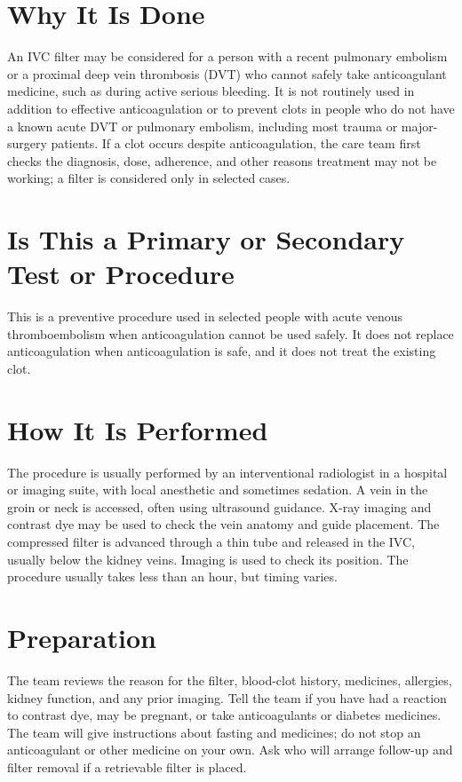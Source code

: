 \section*{Why It Is Done}
An IVC filter may be considered for a person with a recent pulmonary embolism or a proximal deep vein thrombosis (DVT) who cannot safely take anticoagulant medicine, such as during active serious bleeding. It is not routinely used in addition to effective anticoagulation or to prevent clots in people who do not have a known acute DVT or pulmonary embolism, including most trauma or major-surgery patients. If a clot occurs despite anticoagulation, the care team first checks the diagnosis, dose, adherence, and other reasons treatment may not be working; a filter is considered only in selected cases.

\section*{Is This a Primary or Secondary Test or Procedure}
This is a preventive procedure used in selected people with acute venous thromboembolism when anticoagulation cannot be used safely. It does not replace anticoagulation when anticoagulation is safe, and it does not treat the existing clot.

\section*{How It Is Performed}
The procedure is usually performed by an interventional radiologist in a hospital or imaging suite, with local anesthetic and sometimes sedation. A vein in the groin or neck is accessed, often using ultrasound guidance. X-ray imaging and contrast dye may be used to check the vein anatomy and guide placement. The compressed filter is advanced through a thin tube and released in the IVC, usually below the kidney veins. Imaging is used to check its position. The procedure usually takes less than an hour, but timing varies.

\section*{Preparation}
The team reviews the reason for the filter, blood-clot history, medicines, allergies, kidney function, and any prior imaging. Tell the team if you have had a reaction to contrast dye, may be pregnant, or take anticoagulants or diabetes medicines. The team will give instructions about fasting and medicines; do not stop an anticoagulant or other medicine on your own. Ask who will arrange follow-up and filter removal if a retrievable filter is placed.

